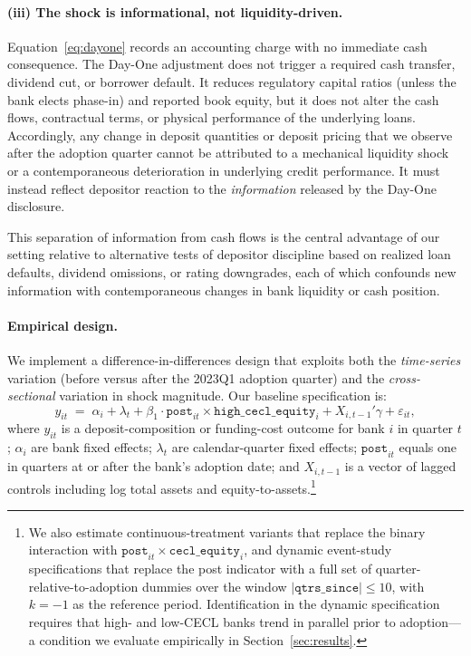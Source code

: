 \paragraph{(iii) The shock is informational, not liquidity-driven.}
Equation~\eqref{eq:dayone} records an accounting charge with no immediate cash
consequence. The Day-One adjustment does not trigger a required cash transfer,
dividend cut, or borrower default. It reduces regulatory capital ratios (unless the
bank elects phase-in) and reported book equity, but it does not alter the cash
flows, contractual terms, or physical performance of the underlying loans.
Accordingly, any change in deposit quantities or deposit pricing that we observe
after the adoption quarter cannot be attributed to a mechanical liquidity shock or
a contemporaneous deterioration in underlying credit performance. It must instead
reflect depositor reaction to the \textit{information} released by the Day-One
disclosure.

This separation of information from cash flows is the central advantage of our
setting relative to alternative tests of depositor discipline based on realized
loan defaults, dividend omissions, or rating downgrades, each of which confounds
new information with contemporaneous changes in bank liquidity or cash position.

\paragraph{Empirical design.}
We implement a difference-in-differences design that exploits both the
\textit{time-series} variation (before versus after the 2023Q1 adoption quarter)
and the \textit{cross-sectional} variation in shock magnitude. Our baseline
specification is:
\begin{equation}
  y_{it}
  \;=\;
  \alpha_i + \lambda_t
  + \beta_1 \cdot \texttt{post}_{it}
    \times \texttt{high\_cecl\_equity}_{i}
  + X_{i,t-1}'\gamma
  + \varepsilon_{it},
  \label{eq:baseline}
\end{equation}
where $y_{it}$ is a deposit-composition or funding-cost outcome for bank $i$ in
quarter $t$; $\alpha_i$ are bank fixed effects; $\lambda_t$ are calendar-quarter
fixed effects; $\texttt{post}_{it}$ equals one in quarters at or after the
bank's adoption date; and $X_{i,t-1}$ is a vector of lagged controls including
log total assets and equity-to-assets.\footnote{We also estimate continuous-treatment
variants that replace the binary interaction with $\texttt{post}_{it}\times
\texttt{cecl\_equity}_i$, and dynamic event-study specifications that replace the
post indicator with a full set of quarter-relative-to-adoption dummies over the
window $|\texttt{qtrs\_since}| \leq 10$, with $k=-1$ as the reference period.
Identification in the dynamic specification requires that high- and low-CECL banks
trend in parallel prior to adoption—a condition we evaluate empirically in
Section~\ref{sec:results}.}

